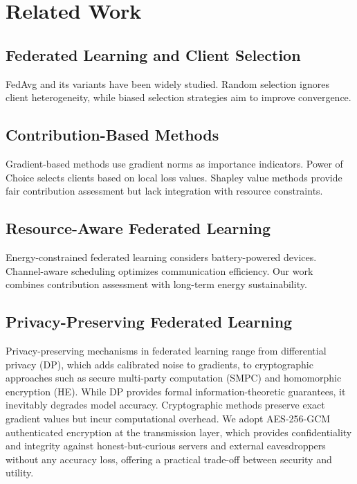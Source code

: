 \section{Related Work}

\subsection{Federated Learning and Client Selection}
FedAvg and its variants have been widely studied. Random selection ignores client heterogeneity, while biased selection strategies aim to improve convergence.

\subsection{Contribution-Based Methods}
Gradient-based methods use gradient norms as importance indicators. Power of Choice selects clients based on local loss values. Shapley value methods provide fair contribution assessment but lack integration with resource constraints.

\subsection{Resource-Aware Federated Learning}
Energy-constrained federated learning considers battery-powered devices. Channel-aware scheduling optimizes communication efficiency. Our work combines contribution assessment with long-term energy sustainability.

\subsection{Privacy-Preserving Federated Learning}
Privacy-preserving mechanisms in federated learning range from differential privacy (DP), which adds calibrated noise to gradients, to cryptographic approaches such as secure multi-party computation (SMPC) and homomorphic encryption (HE). While DP provides formal information-theoretic guarantees, it inevitably degrades model accuracy. Cryptographic methods preserve exact gradient values but incur computational overhead. We adopt AES-256-GCM authenticated encryption at the transmission layer, which provides confidentiality and integrity against honest-but-curious servers and external eavesdroppers without any accuracy loss, offering a practical trade-off between security and utility.
